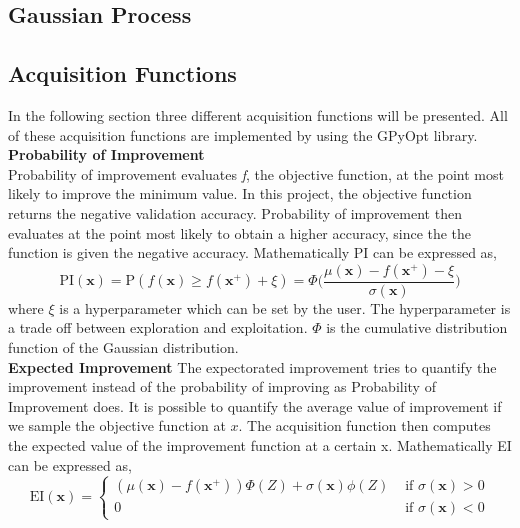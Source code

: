\documentclass[12pt,fleqn]{article}
\begin{document}
\subsection*{Gaussian Process}


\subsection*{Acquisition Functions}
In the following section three different acquisition functions will be presented. All of these acquisition functions are implemented by using the GPyOpt library. \newline
\noindent\\
\textbf{Probability of Improvement} \\
Probability of improvement evaluates \textit{f}, the objective function, at the point most likely to improve the minimum value. In this project, the objective function returns the negative validation accuracy. Probability of improvement then evaluates at the point most likely to obtain a higher accuracy, since the the function is given the negative accuracy. Mathematically PI can be expressed as,
\begin{equation*}
	\text{PI}(\mathbf{x}) = \text{P}(f(\mathbf{x}) \geq f(\mathbf{x}^+) + \xi) 
	= \Phi\biggl(\frac{\mu(\mathbf{x}) - f(\mathbf{x}^+) - \xi}{\sigma(\mathbf{x})}\biggr)
\end{equation*}
\noindent
where $\xi$ is a hyperparameter which can be set by the user. The hyperparameter is a trade off between exploration and exploitation. $\Phi$ is the cumulative distribution function of the Gaussian distribution.
\newline \\
\textbf{Expected Improvement} \newline 
The expectorated improvement tries to quantify the improvement instead of the probability of improving as Probability of Improvement does. It is possible to quantify the average value of improvement if we sample the objective function at $ x $. The acquisition function then computes the expected value of the improvement function at a certain x. Mathematically EI can be expressed as, 
\begin{equation*}
\mathrm{EI}(\mathbf{x})=\left\{\begin{array}{ll}
\left(\mu(\mathbf{x})-f\left(\mathbf{x}^{+}\right)\right) \Phi(Z)+\sigma(\mathbf{x}) \phi(Z) & \text { if } \sigma(\mathbf{x})>0 \\
0 & \text { if } \sigma(\mathbf{x})<0
\end{array}\right.
\end{equation*}
\end{document}
